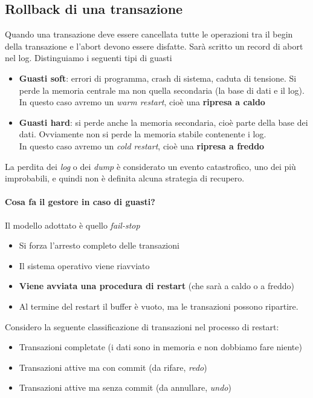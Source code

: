 \subsection{Rollback di una transazione} Quando una transazione deve essere cancellata tutte le operazioni tra il begin della transazione e l'abort devono essere disfatte. Sarà scritto un record di abort nel log. Distinguiamo i seguenti tipi di guasti
\begin{itemize}
	\item \textbf{Guasti soft}: errori di programma, crash di sistema, caduta di tensione. Si perde la memoria centrale ma non quella secondaria (la base di dati e il log).\\
	\small In questo caso avremo un \emph{warm restart}, cioè una \textbf{ripresa a caldo} \normalsize
	\item \textbf{Guasti hard}: si perde anche la memoria secondaria, cioè parte della base dei dati. Ovviamente non si perde la memoria stabile contenente i log.\\
	\small In questo caso avremo un \emph{cold restart}, cioè una \textbf{ripresa a freddo} \normalsize
\end{itemize}
La perdita dei \emph{log} o dei \emph{dump} è considerato un evento catastrofico, uno dei più improbabili, e quindi non è definita alcuna strategia di recupero.
\paragraph{Cosa fa il gestore in caso di guasti?} Il modello adottato è quello \emph{fail-stop}
\begin{itemize}
	\item Si forza l'arresto completo delle transazioni
	\item Il sistema operativo viene riavviato
	\item \textbf{Viene avviata una procedura di restart} (che sarà a caldo o a freddo)
	\item Al termine del restart il buffer è vuoto, ma le transazioni possono ripartire.
\end{itemize}
Considero la seguente classificazione di transazioni nel processo di restart:
\begin{itemize}
	\item Transazioni completate (i dati sono in memoria e non dobbiamo fare niente)
	\item Transazioni attive ma con commit (da rifare, \emph{redo})
	\item Transazioni attive ma senza commit (da annullare, \emph{undo})
\end{itemize}
